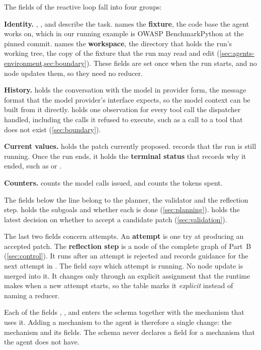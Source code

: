 The fields of the reactive loop fall into four groups:
\bi
\item \textbf{Identity.} , ,  and 
describe the task.  names the \textbf{fixture}, the code base the agent works on,
which in our running example is OWASP BenchmarkPython at the pinned commit. 
names the \textbf{workspace}, the directory that holds the run's working tree, the copy of the
fixture that the run may read and edit (\cref{sec:agents-environment,sec:boundary}). These fields
are set once when the run starts, and no node updates them, so they need no
reducer.
\item \textbf{History.}  holds the conversation with the model in provider form,
the message format that the model provider's interface expects, so the model context can be built
from it directly.  holds one observation for every tool call the dispatcher
handled, including the calls it refused to execute, such as a call to a tool that does not exist
(\cref{sec:boundary}).
\item \textbf{Current values.}  holds the patch currently proposed.
 records that the run is still running. Once the run ends, it holds the
\textbf{terminal status} that records why it ended, such as  or
.
\item \textbf{Counters.}  counts the model calls issued, and 
counts the tokens spent.
\ei

The fields below the line belong to the planner, the validator and the reflection step.
 holds the subgoals and whether each is done (\cref{sec:planning}).
 holds the latest decision on whether to accept a candidate patch
(\cref{sec:validation}).

The last two fields concern attempts. An \textbf{attempt} is one try at producing an accepted patch.
The \textbf{reflection step} is a node of the complete graph of Part~B (\cref{sec:control}). It runs
after an attempt is rejected and records guidance for the next attempt in . The
field  says which attempt is running. No node update is merged into it. It changes
only through an explicit assignment that the runtime makes when a new attempt starts, so the table
marks it \emph{explicit} instead of naming a reducer.

Each of the fields , ,  and
 enters the schema together with the mechanism that uses it. Adding a mechanism to
the agent is therefore a single change: the mechanism and its fields. The schema never declares a
field for a mechanism that the agent does not have.

